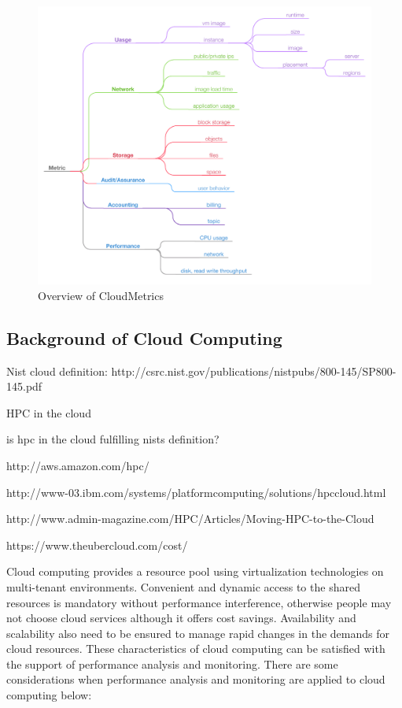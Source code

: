 \documentclass{sig-alternate-05-2015}
\begin{document}
\begin{figure}[h!] 
  \centering 
    \includegraphics[width=1.0\columnwidth]{images/cloudmetric-2.pdf} 
  \caption{Overview of CloudMetrics}\label{F:taxonomy-2} 
\end{figure} 

\subsection{Background of Cloud Computing}


Nist cloud definition:
http://csrc.nist.gov/publications/nistpubs/800-145/SP800-145.pdf

HPC in the cloud

is hpc in the cloud fulfilling nists definition?

http://aws.amazon.com/hpc/

http://www-03.ibm.com/systems/platformcomputing/solutions/hpccloud.html

http://www.admin-magazine.com/HPC/Articles/Moving-HPC-to-the-Cloud

https://www.theubercloud.com/cost/





Cloud computing provides a resource pool using virtualization technologies on
multi-tenant environments. Convenient and dynamic access to the shared
resources is mandatory without performance interference, otherwise people may
not choose cloud services although it offers cost savings. Availability and
scalability also need to be ensured to manage rapid changes in the demands for
cloud resources. These characteristics of cloud computing can be satisfied with
the support of performance analysis and monitoring. There are some
considerations when performance analysis and monitoring are applied to cloud
computing below:
\end{document}
